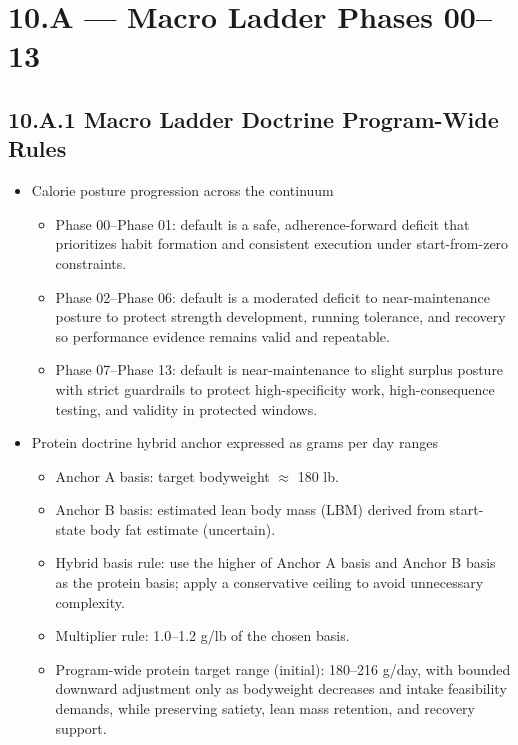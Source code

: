 \documentclass[10pt]{article}
\begin{document}
\section*{10.A — Macro Ladder Phases 00–13}
{}

\subsection*{10.A.1 Macro Ladder Doctrine Program-Wide Rules}
{}

\begin{itemize}
\item Calorie posture progression across the continuum
  \begin{itemize}
  \item Phase 00–Phase 01: default is a safe, adherence-forward deficit that prioritizes habit formation and consistent execution under start-from-zero constraints.
  \item Phase 02–Phase 06: default is a moderated deficit to near-maintenance posture to protect strength development, running tolerance, and recovery so performance evidence remains valid and repeatable.
  \item Phase 07–Phase 13: default is near-maintenance to slight surplus posture with strict guardrails to protect high-specificity work, high-consequence testing, and validity in protected windows.
  \end{itemize}

\item Protein doctrine hybrid anchor expressed as grams per day ranges
  \begin{itemize}
  \item Anchor A basis: target bodyweight $\approx$ 180 lb.
  \item Anchor B basis: estimated lean body mass (LBM) derived from start-state body fat estimate (uncertain).
  \item Hybrid basis rule: use the higher of Anchor A basis and Anchor B basis as the protein basis; apply a conservative ceiling to avoid unnecessary complexity.
  \item Multiplier rule: 1.0–1.2 g/lb of the chosen basis.
  \item Program-wide protein target range (initial): 180–216 g/day, with bounded downward adjustment only as bodyweight decreases and intake feasibility demands, while preserving satiety, lean mass retention, and recovery support.
  \end{itemize}


\end{itemize}
\end{document}
